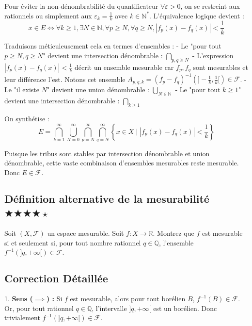 \documentclass[11pt,a4paper]{article}
\begin{document}
Pour éviter la non-dénombrabilité du quantificateur $\forall \varepsilon > 0$, on se restreint aux rationnels ou simplement aux $\varepsilon_k = \frac{1}{k}$ avec $k \in \mathbb{N}^*$. L'équivalence logique devient :
$$ x \in E \iff \forall k \ge 1, \exists N \in \mathbb{N}, \forall p \ge N, \forall q \ge N, |f_p(x) - f_q(x)| < \frac{1}{k} $$

Traduisons méticuleusement cela en termes d'ensembles :
- Le "pour tout $p \ge N, q \ge N$" devient une intersection dénombrable : $\bigcap_{p, q \ge N}$
- L'expression $|f_p(x) - f_q(x)| < \frac{1}{k}$ décrit un ensemble mesurable car $f_p, f_q$ sont mesurables et leur différence l'est. Notons cet ensemble $A_{p,q,k} = (f_p - f_q)^{-1}(]-\frac{1}{k}, \frac{1}{k}[) \in \mathcal{F}$.
- Le "il existe $N$" devient une union dénombrable : $\bigcup_{N \in \mathbb{N}}$
- Le "pour tout $k \ge 1$" devient une intersection dénombrable : $\bigcap_{k \ge 1}$

On synthétise :
$$ E = \bigcap_{k=1}^{\infty} \bigcup_{N=0}^{\infty} \bigcap_{p=N}^{\infty} \bigcap_{q=N}^{\infty} \left\{ x \in X \mid |f_p(x) - f_q(x)| < \frac{1}{k} \right\} $$

Puisque les tribus sont stables par intersection dénombrable et union dénombrable, cette vaste combinaison d'ensembles mesurables reste mesurable. Donc $E \in \mathcal{F}$.


\vspace{0.5cm}

\subsection*{Définition alternative de la mesurabilité \quad $\bigstar\bigstar\bigstar\bigstar\star$}

Soit $(X, \mathcal{F})$ un espace mesurable. Soit $f : X \to \mathbb{R}$.
Montrez que $f$ est mesurable si et seulement si, pour tout nombre rationnel $q \in \mathbb{Q}$, l'ensemble $f^{-1}(]q, +\infty[) \in \mathcal{F}$.

\subsection*{Correction Détaillée}

1. \textbf{Sens ($\implies$) :}
   Si $f$ est mesurable, alors pour tout borélien $B$, $f^{-1}(B) \in \mathcal{F}$. Or, pour tout rationnel $q \in \mathbb{Q}$, l'intervalle $]q, +\infty[$ est un borélien. Donc trivialement $f^{-1}(]q, +\infty[) \in \mathcal{F}$.
\end{document}
